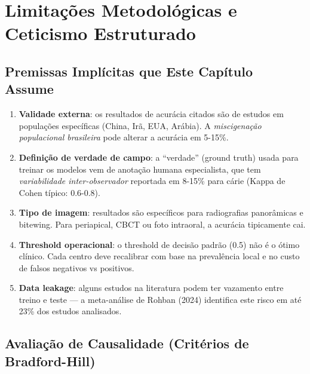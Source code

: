 \section{Limitações Metodológicas e Ceticismo Estruturado}


\subsection*{Premissas Implícitas que Este Capítulo Assume}

\begin{enumerate}
    \item \textbf{Validade externa}: os resultados de acurácia
    citados são de estudos em populações específicas
    (China, Irã, EUA, Arábia). A \emph{miscigenação populacional brasileira}
    pode alterar a acurácia em 5-15\%.
    \item \textbf{Definição de verdade de campo}: a ``verdade''
    (ground truth) usada para treinar os modelos vem de anotação humana
    especialista, que tem \emph{variabilidade inter-observador}
    reportada em 8-15\% para cárie (Kappa de Cohen típico: 0.6-0.8).
    \item \textbf{Tipo de imagem}: resultados são específicos para
    radiografias panorâmicas e bitewing. Para periapical, CBCT ou
    foto intraoral, a acurácia tipicamente cai.
    \item \textbf{Threshold operacional}: o threshold de decisão
    padrão (0.5) não é o ótimo clínico. Cada centro deve recalibrar
    com base na prevalência local e no custo de falsos negativos vs
    positivos.
    \item \textbf{Data leakage}: alguns estudos na literatura
    podem ter vazamento entre treino e teste --- a meta-análise
    de Rohban (2024) \cite{rohban2024} identifica este risco em
    até 23\% dos estudos analisados.
\end{enumerate}

\subsection*{Avaliação de Causalidade (Critérios de Bradford-Hill)}


